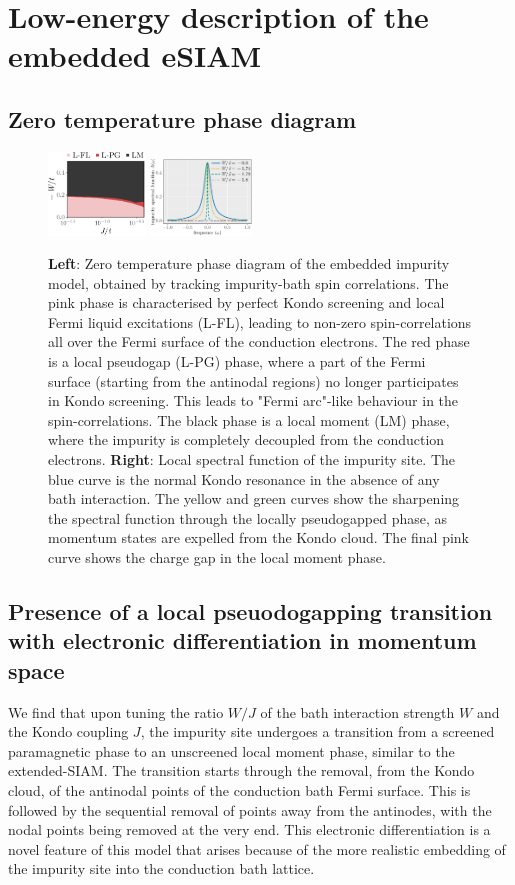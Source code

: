 \documentclass[reprint,hidelinks,onecolumn]{revtex4-2}
\begin{document}
\section{Low-energy description of the embedded eSIAM}
\subsection{Zero temperature phase diagram}
\begin{figure}[htpb]
	\centering
	\includegraphics[width=0.23\textwidth]{phaseDiagram.pdf}
	\includegraphics[width=0.24\textwidth]{impSpecFuncTrunc_49.pdf}
	\caption{{\bf Left}: Zero temperature phase diagram of the embedded impurity model, obtained by tracking impurity-bath spin correlations. The pink phase is characterised by perfect Kondo screening and local Fermi liquid excitations (L-FL), leading to non-zero spin-correlations all over the Fermi surface of the conduction electrons. The red phase is a local pseudogap (L-PG)  phase, where a part of the Fermi surface (starting from the antinodal regions) no longer participates in Kondo screening. This leads to "Fermi arc"-like behaviour in the spin-correlations. The black phase is a local moment (LM) phase, where the impurity is completely decoupled from the conduction electrons. {\bf Right}: Local spectral function of the impurity site. The blue curve is the normal Kondo resonance in the absence of any bath interaction. The yellow and green curves show the sharpening the spectral function through the locally pseudogapped phase, as momentum states are expelled from the Kondo cloud. The final pink curve shows the charge gap in the local moment phase.}
	\label{phaseDiagram}
\end{figure}

\subsection{Presence of a local pseuodogapping transition with electronic differentiation in momentum space}
We find that upon tuning the ratio \(W/J\) of the bath interaction strength \(W\) and the Kondo coupling  \(J\), the impurity site undergoes a transition from a screened paramagnetic phase to an unscreened local moment phase, similar to the extended-SIAM. The transition starts through the removal, from the Kondo cloud, of the antinodal points of the conduction bath Fermi surface. This is followed by the sequential removal of points away from the antinodes, with the nodal points being removed at the very end. This electronic differentiation is a novel feature of this model that arises because of the more realistic embedding of the impurity site into the conduction bath lattice.
\end{document}
